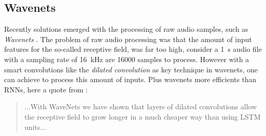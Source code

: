 
\subsection{Wavenets}\label{sec:prev_nn_wavenet}

Recently solutions emerged with the processing of raw audio samples, such as \emph{Wavenets} \cite{Oord2016}.
The problem of raw audio processing was that the amount of input features for the so-called receptive field, was far too high, consider a \SI{1}{\second} audio file with a sampling rate of \SI{16}{\kilo\hertz} are 16000 samples to process.
However with a smart convolutions like the \emph{dilated convolution} as key technique in wavenets, one can achieve to process this amount of inputs.
Plus wavenets more efficients than RNNs, here a quote from \cite{Oord2016}:
\begin{quote}
  ...With WaveNets we have shown that layers of dilated convolutions allow the receptive field to grow longer in a much cheaper way than using LSTM units...
\end{quote}